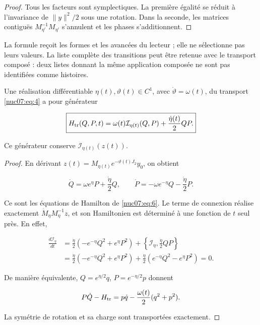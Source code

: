 \begin{proof}
Tous les facteurs sont symplectiques. La première égalité se réduit à l’invariance de \(\|y\|^2/2\) sous une rotation. Dans la seconde, les matrices contiguës \(M_{\eta'}^{-1}M_{\eta'}\) s’annulent et les phases s’additionnent.
\end{proof}

La formule reçoit les formes et les avancées du lecteur ; elle ne sélectionne pas leurs valeurs. La liste complète des transitions peut être retenue avec le transport composé : deux listes donnant la même application composée ne sont pas identifiées comme histoires.

\begin{proposition}
Une réalisation différentiable \(\eta(t),\vartheta(t)\in C^1\), avec \(\dot\vartheta=\omega(t)\), du transport \eqref{nuc07:eq:4} a pour générateur


\begin{equation}
\boxed{
H_{\rm tr}(Q,P,t)=
\omega(t)\mathcal I_{\eta(t)}(Q,P)
+\frac{\dot\eta(t)}2 QP.}
\label{nuc07:eq:6}
\end{equation}

Ce générateur conserve \(\mathcal I_{\eta(t)}(z(t))\).
\end{proposition}

\begin{proof}
En dérivant
\(z(t)=M_{\eta(t)}e^{-\vartheta(t)J_2}y_0\), on obtient

\[
\dot Q=\omega e^\eta P+\frac{\dot\eta}2Q,\qquad
\dot P=-\omega e^{-\eta}Q-\frac{\dot\eta}2P.
\]

Ce sont les équations de Hamilton de \eqref{nuc07:eq:6}. Le terme de connexion réalise exactement \(\dot M_\eta M_\eta^{-1}z\), et son Hamiltonien est déterminé à une fonction de \(t\) seul près. En effet,

\begin{equation}
\begin{aligned}
\frac{d\mathcal I_\eta}{dt}
&=\frac{\dot\eta}{2}(-e^{-\eta}Q^2+e^\eta P^2)
+\left\{\mathcal I_\eta,\frac{\dot\eta}{2}QP\right\}\\
&=\frac{\dot\eta}{2}(-e^{-\eta}Q^2+e^\eta P^2)
+\frac{\dot\eta}{2}(e^{-\eta}Q^2-e^\eta P^2)=0.
\end{aligned}
\label{nuc07:eq:7}
\end{equation}

De manière équivalente, \(Q=e^{\eta/2}q\), \(P=e^{-\eta/2}p\) donnent


\begin{equation}
P\dot Q-H_{\rm tr}
=p\dot q-\frac{\omega(t)}2(q^2+p^2).
\label{nuc07:eq:8}
\end{equation}

La symétrie de rotation et sa charge sont transportées exactement.
\end{proof}

